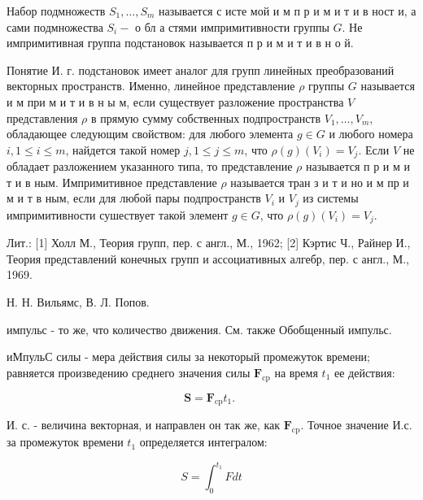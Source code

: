 \documentclass[10pt]{article}
\begin{document}
Набор подмножеств $S_{1}, \ldots, S_{m}$ называется с исте мой и м п р и м и т и в ност и, а сами подмножества $S_{i}-$ о бл а стями импримитивности группы $G$. Не импримитивная группа подстановок называется п р и м и т и в н о й.



Понятие И. г. подстановок имеет аналог для групп линейных преобразований векторных пространств. Именно, линейное представление $\rho$ группы $G$ называется и м при м и т и в н ы м, если существует разложение пространства $V$ представления $\rho$ в прямую сумму собственных подпространств $V_{1}, \ldots, V_{m}$, обладающее следующим свойством: для любого элемента $g \in G$ и любого номера $i, 1 \leqslant i \leqslant m$, найдется такой номер $j, 1 \leqslant j \leqslant m$, что $\rho(g)\left(V_{i}\right)=V_{j}$. Если $V$ не обладает разложением указанного типа, то представление $\rho$ называется п р и м и т и в ным. Импримитивное представление $\rho$ называется тран з и т и но и м пр и м и т в ным, если для любой пары подпространств $V_{i}$ и $V_{j}$ из системы импримитивности сушествует такой элемент $g \in G$, что $\rho(g)\left(V_{i}\right)=V_{j}$.



Лит.: [1] Холл М., Теория групп, пер. с англ., М., 1962; [2] Кэртис Ч., Райнер И., Теория представлений конечных групп и ассоциативных алгебр, пер. с англ., М., 1969.



Н. Н. Вильямс, В. Л. Попов.



импульс - то же, что количество движения. См. также Обобщенный импульс.



иМпульС силы - мера действия силы за некоторый промежуток времени; равняется произведению среднего значения силы $\boldsymbol{F}_{\mathrm{cp}}$ на время $t_{1}$ ее действия:



\[

\boldsymbol{S}=\boldsymbol{F}_{\mathrm{cp}} t_{1} \text {. }

\]



И. с. - величина векторная, и направлен он так же, как $\boldsymbol{F}_{\mathrm{cp}}$. Точное значение И.с. за промежуток времени $t_{1}$ определяется интегралом:



\[

S=\int_{0}^{t_{1}} F d t

\]
\end{document}
